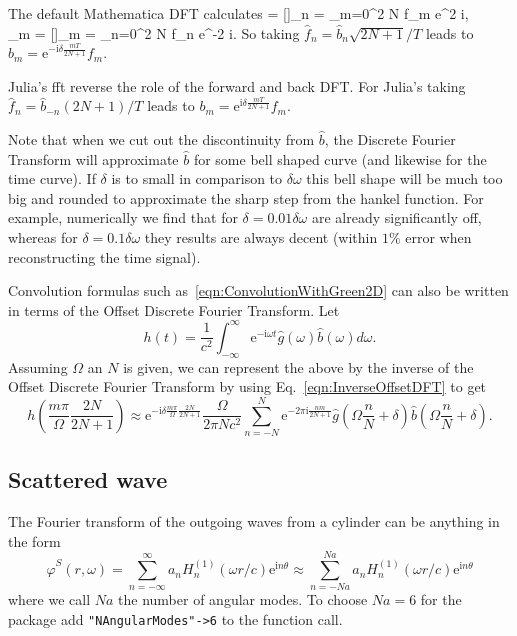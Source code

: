 \documentclass[ 12pt, a4paper]{article}
\newcommand{\be}{\begin{equation}}
\newcommand{\en}{\end{equation}}
\def\bga#1\ega{\begin{gather}#1\end{gather}} %
\newcommand{\ii}{\textrm{i}}
\newcommand{\ee}{\textrm{e}}
\renewcommand{\vec}[1]{\boldsymbol{#1}}
\begin{document}
The default Mathematica DFT calculates
\bga
\hat {\vec f_n} = [\vec f]_n =  \sum_{m=0}^{2 N} f_m \ee^{2 \pi \ii {}},
\\
{\vec f_m} = [\hat{\vec f}]_m =  \sum_{n=0}^{2 N} \hat f_n \ee^{-2 \pi \ii {}}.
\ega
So taking $\hat f_n = \hat b_n \sqrt{2N +1}/T$ leads to $b_m = \ee^{-\ii \delta \frac{m T}{2N+1}} f_m$.

Julia's fft reverse the role of the forward and back DFT. For Julia's taking $\hat f_n = \hat b_{-n} (2N +1)/T$ leads to $b_m = \ee^{\ii \delta \frac{m T}{2N+1}} f_m$.

Note that when we cut out the discontinuity from $\hat b$, the Discrete Fourier Transform will approximate $\hat b$ for some bell shaped curve (and likewise for the time curve). If $\delta$ is to small in comparison to $\delta \omega$ this bell shape will be much too big and rounded to approximate the sharp step from the hankel function. For example, numerically we find that for $\delta = 0.01 \delta \omega$ are already significantly off, whereas for $\delta =0.1 \delta \omega$ they results are always decent (within $1\%$ error when reconstructing the time signal).


Convolution formulas such as~\eqref{eqn:ConvolutionWithGreen2D} can also be written in terms of the Offset Discrete Fourier Transform. Let
\be
h(t) =  \frac{1}{c^2} \int_{-\infty}^\infty \ee^{-\ii \omega t} \hat g(\omega) \hat b(\omega) d \omega.
\en
Assuming $\Omega$ an $N$ is given, we can represent the above by the inverse of the Offset Discrete Fourier Transform by using Eq.~\eqref{eqn:InverseOffsetDFT} to get
\be
h\left (  \frac{m  \pi}{\Omega} \frac{2 N } {2 N +1} \right) \approx \ee^{- \ii \delta \frac{m \pi}{\Omega} \frac{2 N} {2 N +1}}  \frac{\Omega}{2 \pi N c^2}   \sum_{n = -N}^N \ee^{- 2 \pi \ii   \frac{  n m } {2 N +1} } \hat g\left (\Omega \frac{n}{N}  +\delta \right) \hat b\left ( \Omega \frac{n}{N}  +\delta \right)   .
\en
\subsection{Scattered wave}

The Fourier transform of the outgoing waves from a cylinder can be anything in the form
\be
\hat \varphi^S(r, \omega) = \sum_{n= -\infty}^{ \infty} a_n H^{(1)}_n( \omega r/c) \ee^{\ii n \theta} \approx  \sum_{n= -Na}^{ Na} a_n H^{(1)}_n( \omega r/c) \ee^{\ii n \theta}
\label{eqn:ScatteredForm}
\en
where we call $Na$ the number of angular modes. To choose $Na=6$ for the package add \texttt{"NAngularModes"->6} to the function call.
\end{document}
